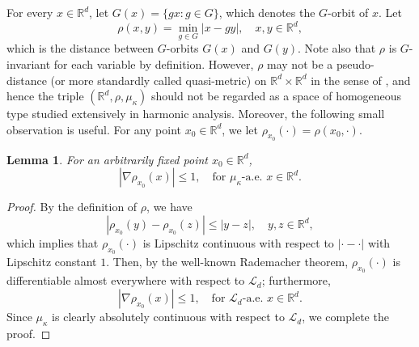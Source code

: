 \documentclass[11pt,a4paper]{article}
\def\R{\mathbb{R}}
\def\L{\mathcal{L}}
\newtheorem{lemma}[theorem]{Lemma}
\theoremstyle{definition}\newtheorem{remark}[theorem]{Remark}
\begin{document}
For every $x\in\R^d$, let $G(x)=\{gx: g\in G\}$, which denotes the $G$-orbit of $x$. Let
$$\rho(x,y)=\min_{g\in G}|x-gy|,\quad x,y\in\R^d,$$
which is the distance between $G$-orbits $G(x)$ and $G(y)$. Note also that $\rho$ is $G$-invariant for each variable by definition. However, $\rho$ may not be a pseudo-distance (or more standardly called quasi-metric) on $\R^d\times\R^d$  in the sense of \cite[Page 66]{CW1971}, and hence the triple $(\R^d,\rho,\mu_\kappa)$ should not be regarded as a space of homogeneous type studied extensively in harmonic analysis. Moreover, the following small observation is useful. For any point $x_0\in\R^d$, we let $\rho_{x_0}(\cdot)=\rho(x_0,\cdot)$.
\begin{lemma}\label{grad-dist}
For an arbitrarily fixed point $x_0\in\R^d$,
\begin{equation*}\label{grad-dist-1}
|\nabla\rho_{x_0}(x)|\leq1,\quad\mbox{for }\mu_\kappa\mbox{-a.e. }x\in\R^d.
\end{equation*}
\end{lemma}
\begin{proof}
By the definition of $\rho$, we have
$$|\rho_{x_0}(y)-\rho_{x_0}(z)|\leq |y-z|, \quad y,z\in\R^d,$$
which implies that $\rho_{x_0}(\cdot)$ is Lipschitz continuous with respect to $|\cdot-\cdot|$ with Lipschitz constant $1$. Then,  by the well-known  Rademacher theorem,  $\rho_{x_0}(\cdot)$ is differentiable almost everywhere with respect to $\L_d$; furthermore,
 $$|\nabla\rho_{x_0}(x)|\leq1,\quad\mbox{for }\L_d\mbox{-a.e. }x\in\R^d.$$
 Since $\mu_\kappa$ is clearly absolutely continuous with respect to $\L_d$, we complete the proof.
\end{proof}
\end{document}
